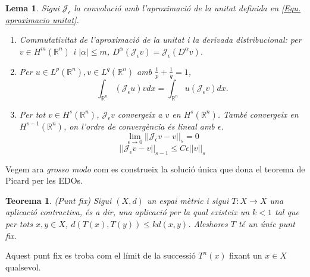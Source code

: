 \documentclass{article}
\numberwithin{equation}{section}
\newtheorem{teorema}{Teorema}[section]
\newtheorem{lema}{Lema}[section]
\begin{document}
\begin{lema}
Sigui $\mathcal{J}_{\epsilon}$ la convoluci\'{o} amb l'aproximaci\'{o} de la unitat definida en \eqref{Equ. aproximacio unitat}.
\begin{enumerate}
\item Commutativitat de l'aproximaci\'{o} de la unitat i la derivada distribucional: per $v\in H^m(\mathbb{R}^n)$ i $|\alpha|\leq m$, $D^{\alpha}(\mathcal{J}_{\epsilon}v)=\mathcal{J}_{\epsilon}(D^{\alpha}v)$.
\item Per $u\in L^p(\mathbb{R}^n),v\in L^q(\mathbb{R}^n)$ amb $\frac{1}{p}+\frac{1}{q}=1$,
\begin{equation}
\int_{\mathbb{R}^n}(\mathcal{J}_{\epsilon}u)vdx=\int_{\mathbb{R}^n}u(\mathcal{J}_{\epsilon}v)dx.
\end{equation}
\item Per tot $v\in H^s(\mathbb{R}^n)$, $\mathcal{J}_{\epsilon}v$ convergeix a $v$ en $H^s(\mathbb{R}^n)$. Tamb\'{e} convergeix en $H^{s-1}(\mathbb{R}^n)$, on l'ordre de converg\`{e}ncia \'{e}s lineal amb $\epsilon$.
\begin{equation}
\lim_{\epsilon\to0}||\mathcal{J}_{\epsilon}v-v||_s=0
\end{equation}
\begin{equation}
||\mathcal{J}_{\epsilon}v-v||_{s-1}\leq C\epsilon||v||_s
\end{equation}
\end{enumerate}
\end{lema}
\vspace{3mm}

Vegem ara \emph{grosso modo} com es construeix la soluci\'{o} \'{u}nica que dona el teorema de Picard per les EDOs.

\begin{teorema}
(Punt fix) Sigui $(X,d)$ un espai m\`{e}tric i sigui $T:X\rightarrow X$ una aplicaci\'{o} contractiva, \'{e}s a dir, una aplicaci\'{o} per la qual existeix un $k<1$ tal que per tots $x,y\in X$, $d(T(x),T(y))\leq kd(x,y)$. Aleshores $T$ t\'{e} un \'{u}nic punt fix.
\end{teorema}

Aquest punt fix es troba com el l\'{i}mit de la successi\'{o} $T^n(x)$ fixant un $x\in X$ qualsevol.
\end{document}
